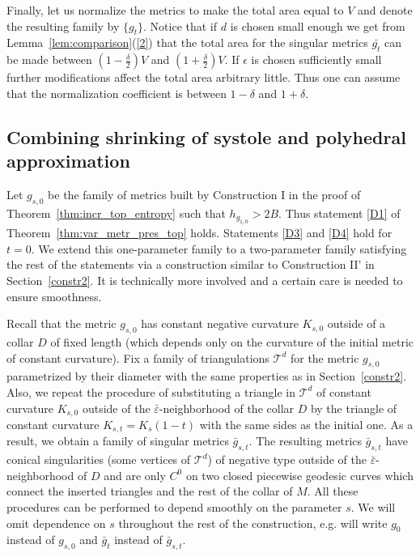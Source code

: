 \documentclass[12pt]{article}
\numberwithin{equation}{section}
\theoremstyle{definition}
\newcommand{\eps}{\varepsilon}
\begin{document}
Finally, let us normalize  the metrics to make the total area equal to $V$ and denote the resulting family by $\{g_t\}$. Notice that if $d$ is chosen  small enough we get from Lemma~\ref{lem:comparison}(\ref{2})  that the total area for the singular metrics $\bar{g_t}$  can be made  between $(1-\frac{\delta}{2})V$ and 
$(1+\frac{\delta}{2})V$.  If  $\epsilon$ is chosen  sufficiently small further modifications affect the total area arbitrary little. Thus one can assume that the normalization coefficient is between $1-\delta$ and $1+\delta$. 



\subsection{Combining shrinking of systole and polyhedral approximation}\label{systole_and_polyhedral}
Let $g_{s,0}$ be the family of  metrics built  by Construction I in the proof of Theorem~\ref{thm:incr_top_entropy} such that $h_{g_{1,0}}>2B$. Thus  statement \ref{D1} of Theorem~\ref{thm:var_metr_pres_top} holds. Statements \ref{D3} and \ref{D4} hold for $t=0$. We  extend this one-parameter family to a two-parameter family satisfying the rest of the statements via a construction similar to Construction II' in Section~\ref{constr2}. It is technically more involved and a certain care is needed to ensure smoothness. 

Recall that the metric $g_{s,0}$ has constant negative curvature $K_{s,0}$ outside of a collar $D$ of fixed length (which depends only on the curvature of the initial metric of constant curvature). Fix a family of triangulations $\mathcal T^d$ for the metric $g_{s,0}$ parametrized by their diameter with the same properties as in Section~\ref{constr2}. Also, we repeat the procedure of substituting a triangle in $\mathcal T^d$ of constant curvature $K_{s,0}$ outside of the $\bar\eps$-neighborhood of the collar $D$ by the triangle of constant curvature $K_{s,t}=K_s(1-t)$ with the same sides as the initial one. As a result, we obtain a family of singular metrics $\bar g_{s,t}$. The resulting metrics $\bar g_{s,t}$ have conical singularities (some vertices of $\mathcal T^d$) of negative type outside of the $\bar\eps$-neighborhood of $D$ and are only $C^0$ on two closed piecewise geodesic curves which connect the inserted triangles and the rest of the collar of $M$. All these procedures can be  performed to depend smoothly on the parameter $s$. We will omit dependence on $s$ throughout the rest of the construction, e.g. will write $g_0$ instead of $g_{s, 0}$ and $\bar g_t$ instead of $\bar g_{s,t}$.  
  
\end{document}
